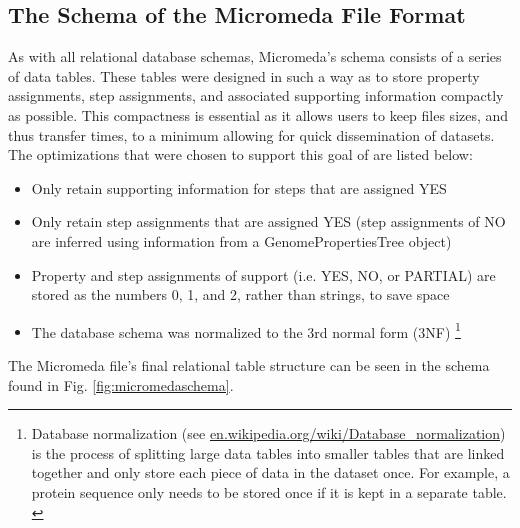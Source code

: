 \subsection{The Schema of the Micromeda File Format}

As with all relational database schemas, Micromeda's schema consists of a series of data tables. These tables were designed in such a way as to store property assignments, step assignments, and associated supporting information compactly as possible. This compactness is essential as it allows users to keep files sizes, and thus transfer times, to a minimum allowing for quick dissemination of datasets. The optimizations that were chosen to support this goal of are listed below:

\begin{itemize}
\item Only retain supporting information for steps that are assigned YES
\item Only retain step assignments that are assigned YES (step assignments of NO are inferred using information from a GenomePropertiesTree object)
\item Property and step assignments of support (i.e. YES, NO, or PARTIAL) are stored as the numbers 0, 1, and 2, rather than strings, to save space
\item The database schema was normalized to the 3rd normal form (3NF) \cite{beeri1989sophisticate} \footnote{Database normalization (see \href{en.wikipedia.org/wiki/Database\_normalization}{en.wikipedia.org/wiki/Database\_normalization}) is the process of splitting large data tables into smaller tables that are linked together and only store each piece of data in the dataset once. For example, a protein sequence only needs to be stored once if it is kept in a separate table. \label{normailization-note}} 
\end{itemize}

The Micromeda file's final relational table structure can be seen in the schema found in Fig. \ref{fig:micromedaschema}.

